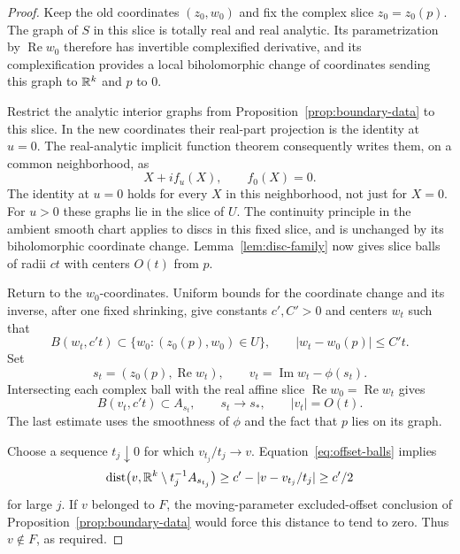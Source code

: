 \begin{proof}
Keep the old coordinates $(z_0,w_0)$ and fix the complex slice
$z_0=z_0(p)$.  The graph of $S$ in this slice is totally real and real
analytic.  Its parametrization by $\operatorname{Re}w_0$ therefore
has invertible complexified derivative, and its complexification
provides a local biholomorphic change of coordinates sending this
graph to $\mathbb R^k$ and $p$ to $0$.

Restrict the analytic interior graphs from
Proposition~\ref{prop:boundary-data} to this slice.  In the new
coordinates their real-part projection is the identity at $u=0$.
The real-analytic implicit function theorem consequently writes them,
on a common neighborhood, as
\[
 X+i f_u(X),\qquad f_0(X)=0.
\]
The identity at $u=0$ holds for every $X$ in this neighborhood, not
just for $X=0$.  For $u>0$ these graphs lie in the slice of $U$.
The continuity principle in the ambient smooth chart applies to
discs in this fixed slice, and is unchanged by its biholomorphic
coordinate change.  Lemma~\ref{lem:disc-family} now gives slice balls
of radii $ct$ with centers $O(t)$ from $p$.

Return to the $w_0$-coordinates.  Uniform bounds for the coordinate
change and its inverse, after one fixed shrinking, give constants
$c',C'>0$ and centers $w_t$ such that
\[
 B(w_t,c't)\subset\{w_0:(z_0(p),w_0)\in U\},
 \qquad |w_t-w_0(p)|\le C't.
\]
Set
\[
 s_t=(z_0(p),\operatorname{Re}w_t),
 \qquad v_t=\operatorname{Im}w_t-\phi(s_t).
\]
Intersecting each complex ball with the real affine slice
$\operatorname{Re}w_0=\operatorname{Re}w_t$ gives
\begin{equation}\label{eq:offset-balls}
 B(v_t,c't)\subset A_{s_t},
 \qquad s_t\longrightarrow s_*,
 \qquad |v_t|=O(t).
\end{equation}
The last estimate uses the smoothness of $\phi$ and the fact that
$p$ lies on its graph.

Choose a sequence $t_j\downarrow0$ for which $v_{t_j}/t_j\to v$.
Equation~\eqref{eq:offset-balls} implies
\[
 \operatorname{dist}\bigl(v,\mathbb R^k\setminus t_j^{-1}A_{s_{t_j}}\bigr)
 \ge c'-|v-v_{t_j}/t_j|\ge c'/2
\]
for large $j$.  If $v$ belonged to $F$, the moving-parameter
excluded-offset conclusion of Proposition~\ref{prop:boundary-data}
would force this distance to tend to zero.  Thus $v\notin F$, as
required.
\end{proof}

